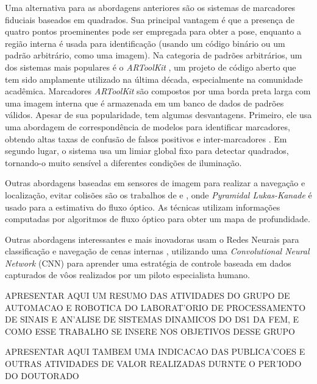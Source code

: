     Uma alternativa para as abordagens anteriores são os sistemas de marcadores fiduciais baseados em quadrados. Sua principal vantagem é que a presença de quatro pontos proeminentes pode ser empregada para obter a pose, enquanto a região interna é usada para identificação (usando um código binário ou um padrão arbitrário, como uma imagem). Na categoria de padrões arbitrários, um dos sistemas mais populares é o \textit{ARToolKit} \cite{Kato1999}, um projeto de código aberto que tem sido amplamente utilizado na última década, especialmente na comunidade acadêmica. Marcadores \textit{ARToolKit} são compostos por uma borda preta larga com uma imagem interna que é armazenada em um banco de dados de padrões válidos. Apesar de sua popularidade, tem algumas desvantagens. Primeiro, ele usa uma abordagem de correspondência de modelos para identificar marcadores, obtendo altas taxas de confusão de falsos positivos e inter-marcadores \cite{Fiala2005} . Em segundo lugar, o sistema usa um limiar global fixo para detectar quadrados, tornando-o muito sensível a diferentes condições de iluminação.
    
    Outras abordagens baseadas em sensores de imagem para realizar a navegação e localização, evitar colisões são os trabalhos de \citet{Zingg2010} e \citet{Lippiello2011}, onde \textit{Pyramidal Lukas-Kanade} é usado para a estimativa do fluxo óptico. As técnicas utilizam informações computadas por algoritmos de fluxo óptico para obter um mapa de profundidade.
    
    Outras abordagens interessantes e mais inovadoras usam o Redes Neurais para classificação e navegação de cenas internas \citet{Kim2015}, utilizando uma \textit{Convolutional Neural Network} (CNN) para aprender uma estratégia de controle baseada em dados capturados de vôos realizados por um piloto especialista humano.
    
    APRESENTAR AQUI UM RESUMO DAS ATIVIDADES DO GRUPO  DE AUTOMACAO E ROBOTICA DO LABORAT'ORIO DE PROCESSAMENTO DE SINAIS E AN'ALISE DE SISTEMAS DINAMICOS DO DS1 DA FEM, E COMO ESSE TRABALHO SE INSERE NOS OBJETIVOS DESSE GRUPO
    
    APRESENTAR AQUI TAMBEM UMA INDICACAO DAS PUBLICA'COES E OUTRAS ATIVIDADES DE VALOR REALIZADAS DURNTE O PER'IODO DO DOUTORADO
    
    


